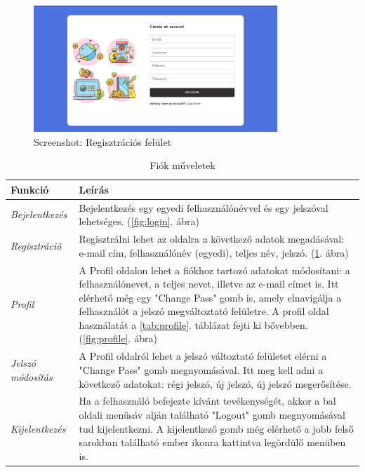 \begin{figure}[H]
	\centering
	\includegraphics[height=180px]{img/register}
	\caption{Screenshot: Regisztrációs felület}
	\label{fig:register}
\end{figure}
\begin{table}[H]
	\centering
	\begin{tabular}{ | m{} | m{} | }
		\hline
		\textbf{Funkció} & \textbf{Leírás} \\
		\hline \hline
		\emph{Bejelentkezés} & Bejelentkezés egy egyedi felhasználónévvel és egy jelszóval lehetséges. (\ref{fig:login}. ábra) \\
		\hline
		\emph{Regisztráció} &  Regisztrálni lehet az oldalra a következő adatok megadásával: e-mail cím, felhasználónév (egyedi), teljes név, jelszó. (\ref{fig:register}. ábra)  \\
		\hline
		\emph{Profil} & A Profil oldalon lehet a fiókhoz tartozó adatokat módosítani: a felhasználónevet, a teljes nevet, illetve az e-mail címet is. Itt elérhető még egy "Change Pass" gomb is, amely elnavigálja a felhasználót a jelszó megváltoztató felületre. A profil oldal használatát a \ref{tab:profile}. táblázat fejti ki bővebben. (\ref{fig:profile}. ábra) \\
		\hline
		\emph{Jelszó módosítás} & A Profil oldalról lehet a jelszó változtató felületet elérni a "Change Pass" gomb megnyomásával. Itt meg kell adni a következő adatokat: régi jelszó, új jelszó, új jelszó megerősítése. \\
		\hline
		\emph{Kijelentkezés} & Ha a felhasználó befejezte kívánt tevékenységét, akkor a bal oldali menüsáv alján található "Logout" gomb megnyomásával tud kijelentkezni. A kijelentkező gomb még elérhető a jobb felső sarokban található ember ikonra kattintva legördülő menüben is. \\
		\hline
	\end{tabular}
	\caption{Fiók műveletek}
	\label{tab:account}
\end{table}

